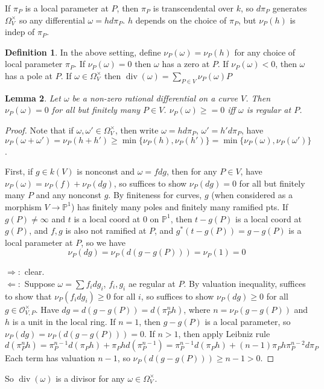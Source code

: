 \documentclass{article}
\theoremstyle{definition}
\newtheorem{defn}{Definition}[section]
\theoremstyle{remark}
\theoremstyle{plain}
\newtheorem{lem}[defn]{Lemma}
\newcommand{\PP}{\mathbb{P}}
\newcommand{\divi}{\operatorname{div}}
\begin{document}
If $\pi_P$ is a local parameter at $P$, then $\pi_P$ is transcendental over $k$, so $d\pi_P$ generates $\Omega_V^\times$ so any differential $\omega=hd\pi_P$. $h$ depends on the choice of $\pi_P$, but $\nu_P(h)$ is indep of $\pi_P$.
\begin{defn}
    In the above setting, define $\nu_P(\omega)=\nu_P(h)$ for any choice of local parameter $\pi_P$. If $\nu_P(\omega)=0$ then $\omega$ has a zero at $P$. If $\nu_P(\omega)<0$, then $\omega$ has a pole at $P$. If $\omega\in\Omega_V^\times$ then $\divi(\omega)=\sum_{P\in V}\nu_P(\omega)P$
\end{defn}
\begin{lem}
    Let $\omega$ be a non-zero rational differential on a curve $V$. Then $\nu_P(\omega)=0$ for all but finitely many $P\in V$. $\nu_P(\omega)\ge=0$ iff $\omega$ is regular at $P$.
\end{lem}
\begin{proof}
    Note that if $\omega,\omega'\in\Omega_V^\times$, then write $\omega=hd\pi_P$, $\omega'=h'd\pi_P$, have $\nu_P(\omega+\omega')=\nu_P(h+h')\ge\min\{\nu_P(h),\nu_P(h')\}=\min\{\nu_P(\omega),\nu_P(\omega')\}$.

    First, if $g\in k(V)$ is nonconst and $\omega=fdg$, then for any $P\in V$, have $\nu_P(\omega)=\nu_P(f)+\nu_P(dg)$, so suffices to show $\nu_P(dg)=0$ for all but finitely many $P$ and any nonconst $g$. By finiteness for curves, $g$ (when considered as a morphism $V\to\PP^1$) has finitely many poles and finitely many ramified pts. If $g(P)\neq\infty$ and $t$ is a local coord at $0$ on $\PP^1$, then $t-g(P)$ is a local coord at $g(P)$, and $f,g$ is also not ramified at $P$, and $g^\ast(t-g(P))=g-g(P)$ is a local parameter at $P$, so we have
    \[\nu_P(dg)=\nu_P(d(g-g(P)))=\nu_P(1)=0\]

    $\Rightarrow:$ clear.\\
    $\Leftarrow:$ Suppose $\omega=\sum f_idg_i$, $f_i,g_i$ ae regular at $P$. By valuation inequality, suffices to show that $\nu_P(f_idg_i)\ge 0$ for all $i$, so suffices to show $\nu_P(dg)\ge 0$ for all $g\in \mathcal O_{V,P}^\times$. Have $dg=d(g-g(P))=d(\pi_P^nh)$, where $n=\nu_P(g-g(P))$ and $h$ is a unit in the local ring. If $n=1$, then $g-g(P)$ is a local parameter, so $\nu_P(dg)=\nu_P(d(g-g(P)))=0$. If $n>1$, then apply Leibniz rule
    \[d(\pi_P^nh)=\pi_P^{n-1}d(\pi_Ph)+\pi_Phd(\pi_P^{n-1})=\pi_P^{n-1}d(\pi_Ph)+(n-1)\pi_Ph\pi_P^{n-2}d\pi_P\]
    Each term has valuation $n-1$, so $\nu_P(d(g-g(P)))\ge n-1>0$.
\end{proof}
So $\divi(\omega)$ is a divisor for any $\omega\in\Omega_V^\times$.
\end{document}
